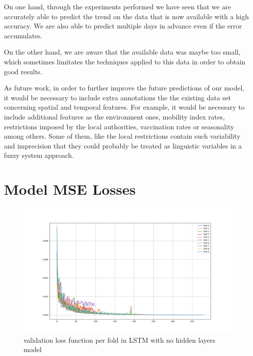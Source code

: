 \documentclass[anon]{CI}
\begin{document}
On one hand, through the experiments performed we have seen that we are accurately able to predict the trend on the data that is now available with a high accuracy. We are also able to predict multiple days in advance even if the error accumulates.

On the other hand, we are aware that the available data was maybe too small, which sometimes limitates the techniques applied to this data in order to obtain good results.

As future work, in order to further improve the future predictions of our model, it would be necessary to include extra annotations the the existing data set concerning spatial and temporal features. For example, it would be necessary to include additional features as the environment ones, mobility index rates, restrictions imposed by the local authorities, vaccination rates or seasonality among others. Some of them, like the local restrictions contain such variability and imprecision that they could probably be treated as linguistic variables in a fuzzy system approach. 

\newpage




\newpage

\appendix

\listoffigures

\listoftables

\newpage

\section{Model MSE Losses}

\begin{figure}[H]
    \center
    \includegraphics[width=\linewidth]{lstm-loss}
    \caption{validation loss function per fold in LSTM with no hidden layers model}
\end{figure}
\end{document}
